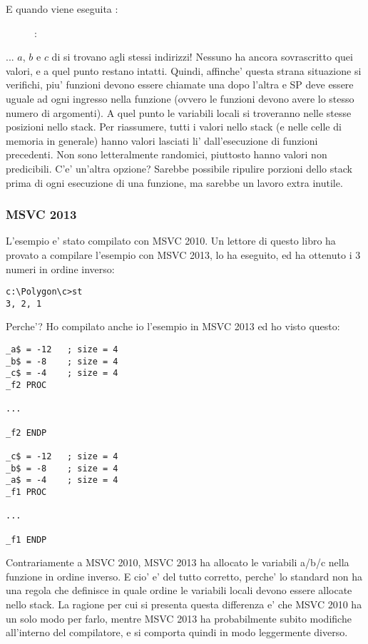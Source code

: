 \clearpage
E quando viene eseguita :

\begin{figure}[H]
\centering
{}
\caption{\olly: }
\label{fig:stack_noise_olly2}
\end{figure}

... $a$, $b$ e $c$ di  si trovano agli stessi indirizzi!
Nessuno ha ancora sovrascritto quei valori, e a quel punto restano intatti.
Quindi, affinche' questa strana situazione si verifichi, piu' funzioni devono essere chiamate una dopo l'altra e
\ac{SP} deve essere uguale ad ogni ingresso nella funzione (ovvero le funzioni devono avere lo stesso numero di argomenti).
A quel punto le variabili locali si troveranno nelle stesse posizioni nello stack.
Per riassumere, tutti i valori nello stack (e nelle celle di memoria in generale) hanno valori lasciati li' dall'esecuzione di funzioni precedenti.
Non sono letteralmente randomici, piuttosto hanno valori non predicibili.
C'e' un'altra opzione?
Sarebbe possibile ripulire porzioni dello stack prima di ogni esecuzione di una funzione, ma sarebbe un lavoro extra inutile.

\subsubsection{MSVC 2013}

L'esempio e' stato compilato con MSVC 2010.
Un lettore di questo libro ha provato a compilare l'esempio con MSVC 2013, lo ha eseguito, ed ha ottenuto i 3 numeri in ordine inverso:%

\begin{lstlisting}
c:\Polygon\c>st
3, 2, 1
\end{lstlisting}

Perche'?
Ho compilato anche io l'esempio in MSVC 2013 ed ho visto questo:


\begin{lstlisting}[caption=MSVC 2013]
_a$ = -12	; size = 4
_b$ = -8	; size = 4
_c$ = -4	; size = 4
_f2	PROC

...

_f2	ENDP

_c$ = -12	; size = 4
_b$ = -8	; size = 4
_a$ = -4	; size = 4
_f1	PROC

...

_f1	ENDP
\end{lstlisting}

Contrariamente a MSVC 2010, MSVC 2013 ha allocato le variabili a/b/c nella funzione  in ordine inverso.%
E cio' e' del tutto corretto, perche' lo standard \CCpp non ha una regola che definisce in quale ordine le variabili locali devono essere allocate nello stack.
La ragione per cui si presenta questa differenza e' che MSVC 2010 ha un solo modo per farlo, mentre MSVC 2013 ha probabilmente subito modifiche all'interno del compilatore, e si comporta quindi in modo leggermente diverso. 
